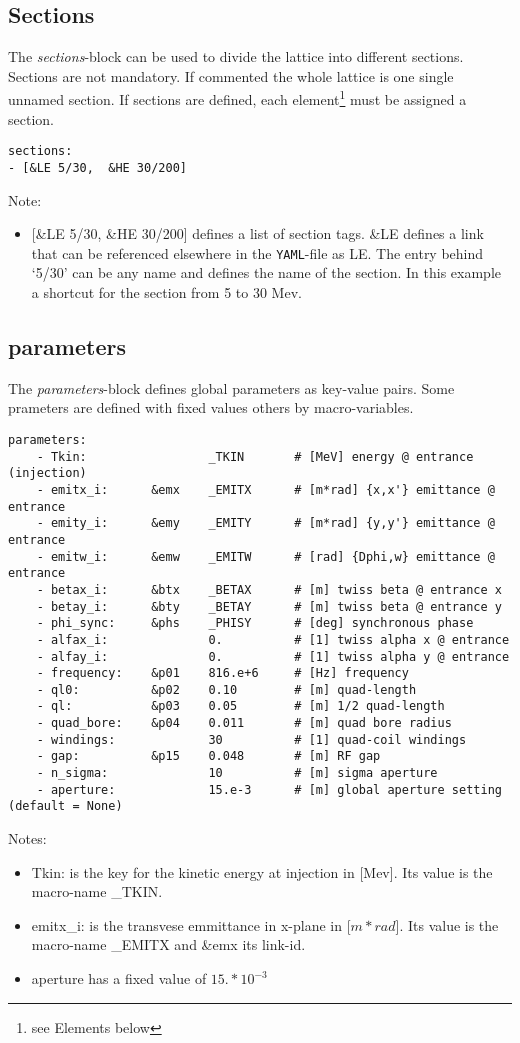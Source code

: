 \documentclass[10pt]{article}
\begin{document}
\subsection{Sections}
The \emph{sections}-block can be used to divide the lattice into different sections. Sections are not mandatory. If commented the whole lattice is one single unnamed section. If sections are defined, each element\footnote{see Elements below} must be assigned a section.
\begin{verbatim}
sections:
- [&LE 5/30,  &HE 30/200]
\end{verbatim}
Note:
\begin{itemize}
\item {[}\&LE 5/30, \&HE 30/200{]} defines a list of section tags. \&LE defines a link that can
be referenced elsewhere in the \verb+YAML+-file as \textasteriskcentered LE. The entry behind `5/30' can be any name and defines the
 name of the section. In this example a shortcut for the section from 5 to 30 Mev.
\end{itemize}

\subsection{parameters}
The \emph{parameters}-block defines global parameters as key-value pairs. Some prameters are defined with 
fixed values others by macro-variables.
\begin{verbatim}
parameters:
    - Tkin:                 _TKIN       # [MeV] energy @ entrance (injection)
    - emitx_i:      &emx    _EMITX      # [m*rad] {x,x'} emittance @ entrance
    - emity_i:      &emy    _EMITY      # [m*rad] {y,y'} emittance @ entrance
    - emitw_i:      &emw    _EMITW      # [rad] {Dphi,w} emittance @ entrance
    - betax_i:      &btx    _BETAX      # [m] twiss beta @ entrance x
    - betay_i:      &bty    _BETAY      # [m] twiss beta @ entrance y
    - phi_sync:     &phs    _PHISY      # [deg] synchronous phase
    - alfax_i:              0.          # [1] twiss alpha x @ entrance
    - alfay_i:              0.          # [1] twiss alpha y @ entrance
    - frequency:    &p01    816.e+6     # [Hz] frequency
    - ql0:          &p02    0.10        # [m] quad-length
    - ql:           &p03    0.05        # [m] 1/2 quad-length
    - quad_bore:    &p04    0.011       # [m] quad bore radius
    - windings:             30          # [1] quad-coil windings
    - gap:          &p15    0.048       # [m] RF gap
    - n_sigma:              10          # [m] sigma aperture
    - aperture:             15.e-3      # [m] global aperture setting (default = None)
\end{verbatim}
Notes:
\begin{itemize}
\item Tkin: is the key for the kinetic energy at injection in [Mev]. Its value is the macro-name \_TKIN.
\item emitx\_i: is the transvese emmittance in x-plane in [$m*rad$]. Its value is the macro-name \_EMITX and
\&emx its link-id.
\item aperture has a fixed value of $15.*10^{-3}$
\end{itemize}
\end{document}
